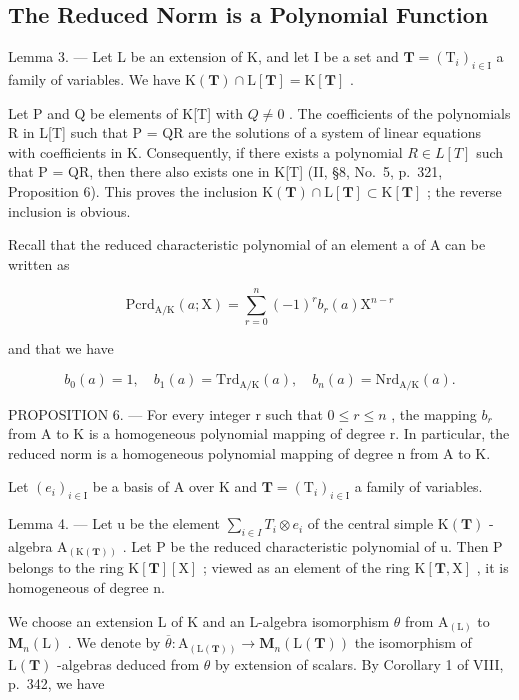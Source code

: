 \subsection{The Reduced Norm is a Polynomial Function}

Lemma 3. --- Let L be an extension of K, and let I be a set and \(\mathbf{T} = (\mathrm{T}_i)_{i\in \mathrm{I}}\) a family of variables. We have \(\mathrm{K}(\mathbf{T})\cap \mathrm{L}[\mathbf{T}] = \mathrm{K}[\mathbf{T}]\) .

Let P and Q be elements of K{[}T{]} with \(Q \neq 0\) . The coefficients of the polynomials R in L{[}T{]} such that P = QR are the solutions of a system of linear equations with coefficients in K. Consequently, if there exists a polynomial \(R \in L[T]\) such that P = QR, then there also exists one in K{[}T{]} (II, §8, No.~5, p.~321, Proposition 6). This proves the inclusion \(\mathrm{K}(\mathbf{T}) \cap \mathrm{L}[\mathbf{T}] \subset \mathrm{K}[\mathbf{T}]\) ; the reverse inclusion is obvious.

Recall that the reduced characteristic polynomial of an element a of A can be written as

\[
\mathrm{Pcrd} _ {\mathrm{A/K}} (a; \mathrm{X}) = \sum_ {r = 0} ^ {n} (- 1) ^ {r} b _ {r} (a) \mathrm{X} ^ {n - r}\tag{46}
\]

and that we have

\[
b _ {0} (a) = 1, \quad b _ {1} (a) = \mathrm{Trd} _ {\mathrm{A/K}} (a), \quad b _ {n} (a) = \mathrm{Nrd} _ {\mathrm{A/K}} (a).
\]

PROPOSITION 6. --- For every integer r such that \(0 \leqslant r \leqslant n\) , the mapping \(b_{r}\) from A to K is a homogeneous polynomial mapping of degree r. In particular, the reduced norm is a homogeneous polynomial mapping of degree n from A to K.

Let \((e_{i})_{i\in\mathrm{I}}\) be a basis of A over K and \(\mathbf{T}=(\mathrm{T}_{i})_{i\in\mathrm{I}}\) a family of variables.

Lemma 4. --- Let u be the element \(\sum_{i\in I}T_{i}\otimes e_{i}\) of the central simple \(\mathrm{K}(\mathbf{T})\) -algebra \(\mathrm{A}_{(\mathrm{K}(\mathbf{T}))}\) . Let P be the reduced characteristic polynomial of u. Then P belongs to the ring \(\mathrm{K}[\mathbf{T}][\mathrm{X}]\) ; viewed as an element of the ring \(\mathrm{K}[\mathbf{T},\mathrm{X}]\) , it is homogeneous of degree n.

We choose an extension L of K and an L-algebra isomorphism \(\theta\) from \(\mathrm{A}_{(\mathrm{L})}\) to \(\mathbf{M}_{n}(\mathrm{L})\) . We denote by \(\overline{\theta}: \mathrm{A}_{(\mathrm{L}(\mathbf{T}))} \to \mathbf{M}_{n}(\mathrm{L}(\mathbf{T}))\) the isomorphism of \(\mathrm{L}(\mathbf{T})\) -algebras deduced from \(\theta\) by extension of scalars. By Corollary 1 of VIII, p.~342, we have

